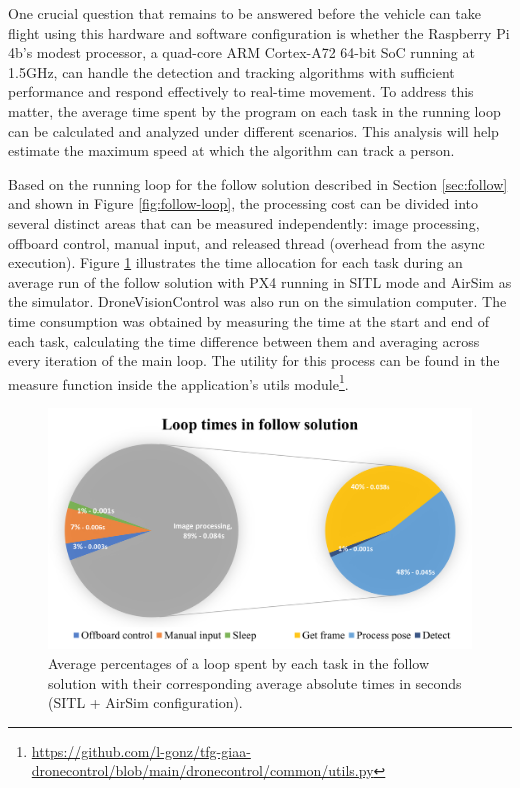 One crucial question that remains to be answered before the vehicle can take flight using this hardware and software configuration is whether the Raspberry Pi 4b's modest processor, a quad-core ARM Cortex-A72 64-bit SoC running at 1.5GHz, can handle the detection and tracking algorithms with sufficient performance and respond effectively to real-time movement. To address this matter, the average time spent by the program on each task in the running loop can be calculated and analyzed under different scenarios. This analysis will help estimate the maximum speed at which the algorithm can track a person.


Based on the running loop for the follow solution described in Section \ref{sec:follow} and shown in Figure \ref{fig:follow-loop}, the processing cost can be divided into several distinct areas that can be measured independently: image processing, offboard control, manual input, and released thread (overhead from the async execution). Figure \ref{fig:perf-sitl-sim} illustrates the time allocation for each task during an average run of the follow solution with PX4 running in SITL mode and AirSim as the simulator. DroneVisionControl was also run on the simulation computer. The time consumption was obtained by measuring the time at the start and end of each task, calculating the time difference between them and averaging across every iteration of the main loop. The utility for this process can be found in the measure function inside the application's utils module\footnote{\url{https://github.com/l-gonz/tfg-giaa-dronecontrol/blob/main/dronecontrol/common/utils.py}}.

\begin{figure}[H]
  \centering
  \includegraphics[width=.9\textwidth, keepaspectratio]{img/sitl-performance.png}
  \caption{Average percentages of a loop spent by each task in the follow solution with their corresponding average absolute times in seconds (SITL + AirSim configuration).}
  \label{fig:perf-sitl-sim}
\end{figure}


